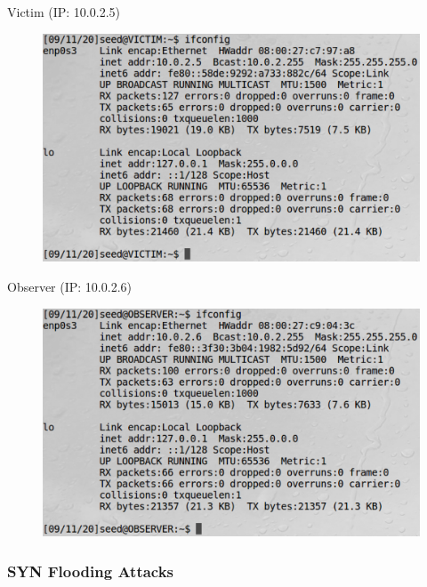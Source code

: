 \documentclass[12pt]{article}
\begin{document}
\newpage

\begin{center}
    Victim (IP: 10.0.2.5)
\end{center}

\begin{figure}[H]
    \centering
    \includegraphics[width=1\textwidth]{tcp-victim-config.png}
\end{figure}



\newpage

\begin{center}
    Observer (IP: 10.0.2.6)
\end{center}


\begin{figure}[H]
    \centering
    \includegraphics[width=1\textwidth]{tcp-observer-config.png}
\end{figure}



\newpage

\subsubsection{SYN Flooding Attacks}
\end{document}
